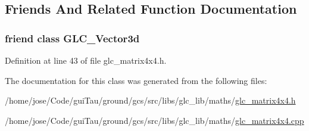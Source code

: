 \subsection{Friends And Related Function Documentation}
\hypertarget{class_g_l_c___matrix4x4_a12e30aa3c4b9461968961178e9c38b10}{
\subsubsection[{G\-L\-C\-\_\-\-Vector3d}]{\setlength{\rightskip}{0pt plus 5cm}friend class {\bf G\-L\-C\-\_\-\-Vector3d}\hspace{0.3cm}{\ttfamily [friend]}}}\label{class_g_l_c___matrix4x4_a12e30aa3c4b9461968961178e9c38b10}


Definition at line 43 of file glc\-\_\-matrix4x4.\-h.



The documentation for this class was generated from the following files\-:\begin{DoxyCompactItemize}
\item 
/home/jose/\-Code/gui\-Tau/ground/gcs/src/libs/glc\-\_\-lib/maths/\hyperlink{glc__matrix4x4_8h}{glc\-\_\-matrix4x4.\-h}\item 
/home/jose/\-Code/gui\-Tau/ground/gcs/src/libs/glc\-\_\-lib/maths/\hyperlink{glc__matrix4x4_8cpp}{glc\-\_\-matrix4x4.\-cpp}\end{DoxyCompactItemize}

